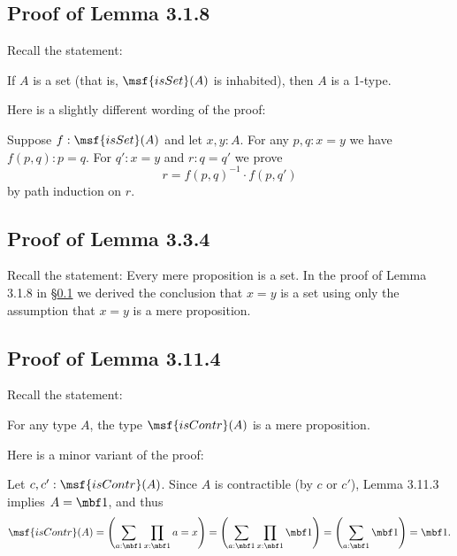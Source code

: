 \documentclass[12pt]{article}
\begin{document}
\subsection{Proof of Lemma 3.1.8}\label{318}

Recall the statement: 

If $A$ is a set (that is, $\msf{isSet}(A)$ is inhabited), then $A$ is a 1-type. 

Here is a slightly different wording of the proof:

Suppose $f:\msf{isSet}(A)$ and let $x,y:A$. For any $p,q:x=y$ we have $f(p,q):p=q$. For $q':x=y$ and $r:q=q'$ we prove 
$$
r=f(p,q)^{-1}\cdot f(p,q')
$$ 
by path induction on $r$.





\subsection{Proof of Lemma 3.3.4}

Recall the statement: Every mere proposition is a set. In the proof of Lemma 3.1.8 in \S\ref{318} we derived the conclusion that $x=y$ is a set using only the assumption that $x=y$ is a mere proposition.


\subsection{Proof of Lemma 3.11.4} 

Recall the statement: 

For any type $A$, the type $\msf{isContr}(A)$ is a mere proposition.

Here is a minor variant of the proof:

Let $c,c':\msf{isContr}(A)$. Since $A$ is contractible (by $c$ or $c'$), Lemma 3.11.3 implies $A=\mbf1$, and thus 
$$
\msf{isContr}(A)=\left(\sum_{a:\mbf1}\prod_{x:\mbf1}a=x\right)=\left(\sum_{a:\mbf1}\prod_{x:\mbf1}\mbf1\right)=\left(\sum_{a:\mbf1}\mbf1\right)=\mbf1.
$$
\end{document}
